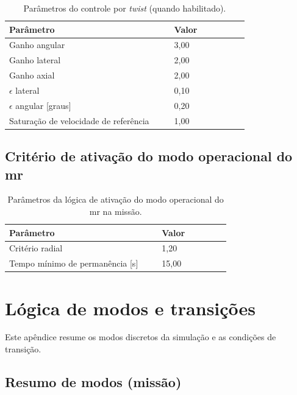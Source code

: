 \begin{table}[H]
\centering
\caption{Parâmetros do controle por \textit{twist} (quando habilitado).}
\label{tab:apC_twist}
\begin{tabular}{|p{0.62\linewidth}|p{0.28\linewidth}|}
\hline
\textbf{Parâmetro} & \textbf{Valor}\\
\hline
Ganho angular & 3,00\\
\hline
Ganho lateral & 2,00\\
\hline
Ganho axial & 2,00\\
\hline
$\epsilon$ lateral & 0,10\\
\hline
$\epsilon$ angular [graus] & 0,20\\
\hline
Saturação de velocidade de referência & 1,00\\
\hline
\end{tabular}
\end{table}

\subsection{Critério de ativação do modo operacional do \gls{mr}}
\label{apC:ativacao_modo_op}

\begin{table}[H]
\centering
\caption{Parâmetros da lógica de ativação do modo operacional do \gls{mr} na missão.}
\label{tab:apC_modo_op}
\begin{tabular}{|p{0.62\linewidth}|p{0.28\linewidth}|}
\hline
\textbf{Parâmetro} & \textbf{Valor}\\
\hline
Critério radial & 1,20\\
\hline
Tempo mínimo de permanência [s] & 15,00\\
\hline
\end{tabular}
\end{table}


\section{Lógica de modos e transições}
\label{ap:apendiceD_modos_transicoes}

Este apêndice resume os modos discretos da simulação e as condições de transição.

\subsection{Resumo de modos (missão)}
\label{apD:resumo_modos}

